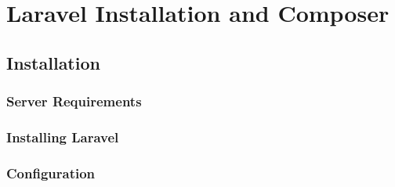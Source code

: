 \chapter{Laravel Installation and Composer}
\section{Installation}
\subsection{Server Requirements}
\subsection{Installing Laravel}
\subsection{Configuration}

